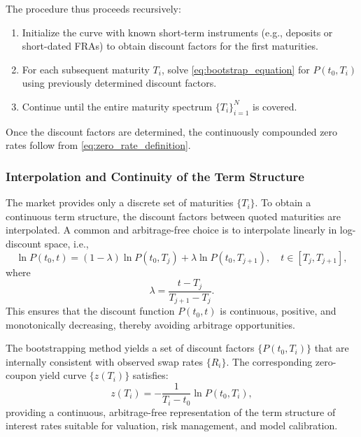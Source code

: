 The procedure thus proceeds recursively:
\begin{enumerate}
    \item Initialize the curve with known short-term instruments (e.g., deposits or short-dated FRAs) to obtain discount factors for the first maturities.
    \item For each subsequent maturity $T_i$, solve \eqref{eq:bootstrap_equation} for $P(t_0, T_i)$ using previously determined discount factors.
    \item Continue until the entire maturity spectrum $\{T_i\}_{i=1}^N$ is covered.
\end{enumerate}

Once the discount factors are determined, the continuously compounded zero rates follow from \eqref{eq:zero_rate_definition}.

\subsubsection{Interpolation and Continuity of the Term Structure}
The market provides only a discrete set of maturities $\{T_i\}$. To obtain a continuous term structure, the discount factors between quoted maturities are interpolated. A common and arbitrage-free choice is to interpolate linearly in log-discount space, i.e.,
\begin{equation}
    \ln P(t_0, t) = (1 - \lambda) \ln P(t_0, T_j) + \lambda \ln P(t_0, T_{j+1}),
    \quad t \in [T_j, T_{j+1}],
    \label{eq:log_linear_interpolation}
\end{equation}
where
\begin{equation}
    \lambda = \frac{t - T_j}{T_{j+1} - T_j}.
\end{equation}
This ensures that the discount function $P(t_0, t)$ is continuous, positive, and monotonically decreasing, thereby avoiding arbitrage opportunities.

The bootstrapping method yields a set of discount factors $\{P(t_0, T_i)\}$ that are internally consistent with observed swap rates $\{R_i\}$. The corresponding zero-coupon yield curve $\{z(T_i)\}$ satisfies:
\begin{equation}
    z(T_i) = -\frac{1}{T_i - t_0} \ln P(t_0, T_i),
\end{equation}
providing a continuous, arbitrage-free representation of the term structure of interest rates suitable for valuation, risk management, and model calibration.


